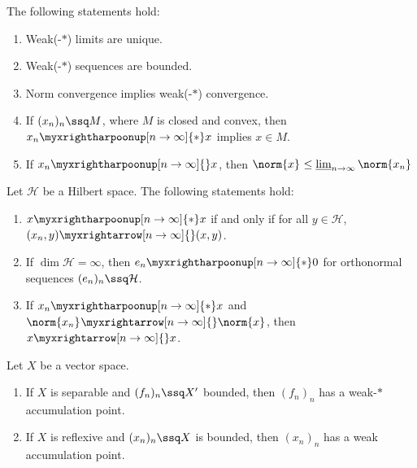 \begin{thm}
    The following statements hold:
    \begin{enumerate}
      \item Weak(-$*$) limits are unique.
      \item Weak(-$*$) sequences are bounded.
      \item Norm convergence implies weak(-$*$) convergence.
      \item If $(x_n)_n\ssq M$, where $M$ is closed and convex, then $x_n \myxrightharpoonup[n\to\infty]{*}x$ implies $x\in M$.
      \item If $x_n \myxrightharpoonup[n\to\infty]{}x$, then \( \norm{x}_{}^{}\leq \varliminf_{n \to \infty} \norm{x_n}_{}^{}\)
    \end{enumerate}
\end{thm}

\begin{thm}
    Let $\mathcal{H}$ be a Hilbert space. The following statements hold:
    \begin{enumerate}
      \item $x \myxrightharpoonup[n\to\infty]{*}x$ if and only if for all $y\in \mathcal{H}$, $(x_n,y) \myxrightarrow[n\to\infty]{}(x,y)$.
      \item If $\dim \mathcal{H}= \infty$, then $e_n \myxrightharpoonup[n\to\infty]{*}0$ for orthonormal sequences $(e_n)_n \ssq \mathcal{H}$.
      \item If $x_n \myxrightharpoonup[n\to\infty]{*}x$ and \(\norm{x_n}_{}^{} \myxrightarrow[n\to\infty]{}\norm{x}\), then \(x \myxrightarrow[n\to\infty]{}x\).
    \end{enumerate}
\end{thm}

\begin{thm}
  Let $X$ be a vector space.
  \begin{enumerate}
    \item If $X$ is separable and $(f_{n})_{n }\ssq X'$ bounded, then \((f_{n})_{n }\) has a weak-$*$ accumulation point. 
    \item If $X$ is reflexive and \((x_{n})_{n }\ssq X\) is bounded, then \((x_{n})_{n }\) has a weak accumulation point.
  \end{enumerate}
\end{thm}




